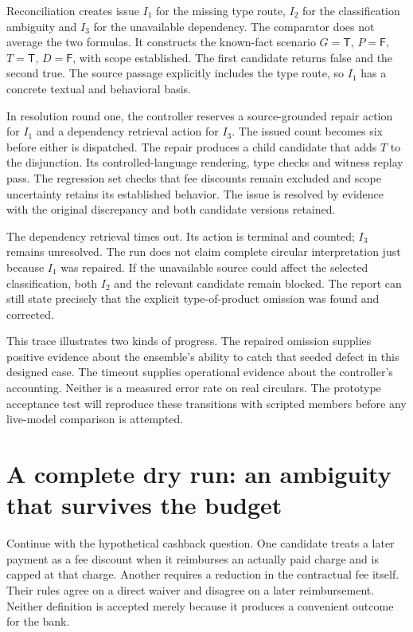 \documentclass[12pt,a4paper,oneside,openany]{book}
\newcommand{\True}{\mathsf{T}}
\newcommand{\False}{\mathsf{F}}
\begin{document}
Reconciliation creates issue $I_1$ for the missing type route, $I_2$ for the
classification ambiguity and $I_3$ for the unavailable dependency. The comparator
does not average the two formulas. It constructs the known-fact scenario
$G=\True$, $P=\False$, $T=\True$, $D=\False$, with scope established. The first
candidate returns false and the second true. The source passage explicitly
includes the type route, so $I_1$ has a concrete textual and behavioral basis.

In resolution round one, the controller reserves a source-grounded repair action
for $I_1$ and a dependency retrieval action for $I_3$. The issued count becomes
six before either is dispatched. The repair produces a child candidate that adds
$T$ to the disjunction. Its controlled-language rendering, type checks and witness
replay pass. The regression set checks that fee discounts remain excluded and
scope uncertainty retains its established behavior. The issue is resolved by
evidence with the original discrepancy and both candidate versions retained.

The dependency retrieval times out. Its action is terminal and counted; $I_3$
remains unresolved. The run does not claim complete circular interpretation just
because $I_1$ was repaired. If the unavailable source could affect the selected
classification, both $I_2$ and the relevant candidate remain blocked. The report
can still state precisely that the explicit type-of-product omission was found
and corrected.

This trace illustrates two kinds of progress. The repaired omission supplies
positive evidence about the ensemble's ability to catch that seeded defect in
this designed case. The timeout supplies operational evidence about the
controller's accounting. Neither is a measured error rate on real circulars.
The prototype acceptance test will reproduce these transitions with scripted
members before any live-model comparison is attempted.

\section{A complete dry run: an ambiguity that survives the budget}
\label{merge:M06:21}


Continue with the hypothetical cashback question. One candidate treats a later
payment as a fee discount when it reimburses an actually paid charge and is capped
at that charge. Another requires a reduction in the contractual fee itself.
Their rules agree on a direct waiver and disagree on a later reimbursement.
Neither definition is accepted merely because it produces a convenient outcome
for the bank.
\end{document}
